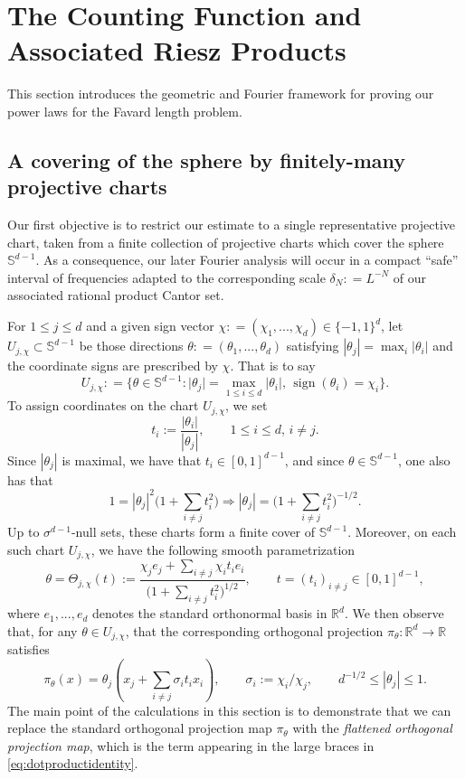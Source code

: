 \documentclass[12pt]{amsart}
\numberwithin{equation}{section}
\DeclareMathOperator{\sign}{sign}
\begin{document}
\section{The Counting Function and Associated Riesz Products}\label{sec:toolbox}

This section introduces the geometric and Fourier framework for proving our power laws for the Favard length problem.

\subsection{A covering of the sphere by finitely-many projective charts}
Our first objective is to restrict our estimate to a single representative projective chart, taken from a finite collection of projective charts which cover the sphere $\mathbb{S}^{d-1}$. As a consequence, our later Fourier analysis will occur in a compact ``safe'' interval of frequencies adapted to the corresponding scale $\delta_N : = L^{-N}$ of our associated rational product Cantor set.

For $1\leq j\leq d$ and a given sign vector
$\chi : = (\chi_1,...,\chi_d) \in\{-1,1\}^d$, let $U_{j,\chi} \subset \mathbb{S}^{d-1}$ be those directions $\theta : = (\theta_1,...,\theta_d)$ satisfying
$|\theta_j|=\max_i|\theta_i|$ and the coordinate signs are prescribed by $\chi$. That is to say
$$
U_{j, \chi} : = \big\{ \theta \in \mathbb{S}^{d-1} : \vert \theta_j \vert = \max_{1 \leq i \leq d}\vert \theta_i\vert, \, \sign (\theta_i) = \chi_i \big\}.
$$
To assign coordinates on the chart $U_{j,\chi}$, we set
$$
t_i:=\frac{|\theta_i|}{|\theta_j|}, \qquad 1 \leq i \leq d, \, i \neq j.
$$
Since $|\theta_j|$ is maximal, we have that $t_i \in [0,1]^{d-1}$, and since $\theta \in \mathbb{S}^{d-1}$, one also has that
$$
1=|\theta_j|^2\bigg(1+\sum_{i\neq j}t_i^2\bigg) \Longrightarrow 
|\theta_j|=\bigg(1+\sum_{i\neq j}t_i^2\bigg)^{-1/2}.
$$
Up to $\sigma^{d-1}$-null sets, these charts form a finite cover of $\mathbb S^{d-1}$. Moreover, on each such chart $U_{j,\chi}$, we have the following smooth parametrization
\begin{equation}\label{eq:changeofvariablestheta}
 \theta=\Theta_{j,\chi}(t)
 :=\frac{\chi_j e_j+\sum_{i\ne j}\chi_i t_i e_i}
 {\bigl(1+\sum_{i\ne j}t_i^2\bigr)^{1/2}},
 \qquad t=(t_i)_{i\ne j}\in[0,1]^{d-1},
\end{equation}
where $e_1,...,e_d$ denotes the standard orthonormal basis in $\mathbb{R}^d$. We then observe that, for any $\theta \in U_{j, \chi}$, that the corresponding orthogonal projection $\pi_{\theta} : \mathbb{R}^d \rightarrow \mathbb{R}$ satisfies
\begin{equation}\label{eq:dotproductidentity}
 \pi_\theta(x)=\theta_j\left(x_j+\sum_{i\ne j}\sigma_i t_i x_i\right),
 \qquad \sigma_i:=\chi_i/\chi_j,
 \qquad d^{-1/2}\leq |\theta_j|\leq1.
\end{equation}
The main point of the calculations in this section is to demonstrate that we can replace the standard orthogonal projection map $\pi_{\theta}$ with the \textit{flattened orthogonal projection map}, which is the term appearing in the large braces in \eqref{eq:dotproductidentity}.
\end{document}
